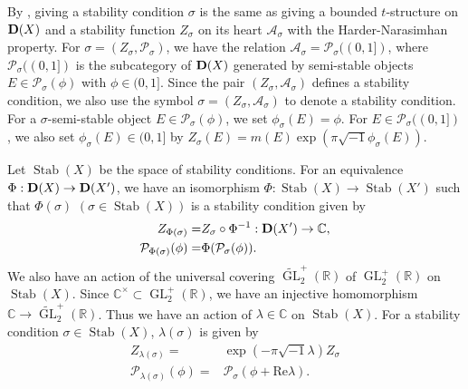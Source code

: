 \documentclass[10pt]{amsart}
\def\cal{\mathcal}
\def\Bbb{\mathbb}
\newcommand{\GL}  {\operatorname{GL}}
\newcommand{\Stab}{\operatorname{Stab}}
\numberwithin{equation}{section}
\theoremstyle{plain}
\theoremstyle{definition}
\theoremstyle{remark}
\begin{document}
By \cite[Prop. 5.3]{Br:stability},
giving a stability condition $\sigma$ is
the same as giving a bounded $t$-structure on ${\bf D}(X)$ 
and a stability function $Z_\sigma$ on its heart ${\cal A}_\sigma$
with the Harder-Narasimhan property.
For $\sigma=(Z_\sigma,{\cal P}_\sigma)$,
we have the relation ${\cal A}_\sigma ={\cal P}_\sigma((0,1])$,
where ${\cal P}_\sigma((0,1])$ is the subcategory of ${\bf D}(X)$
generated by semi-stable objects $E \in {\cal P}_\sigma(\phi)$ with 
$\phi \in (0,1]$.  
Since the pair $(Z_\sigma,{\cal A}_\sigma)$
defines a stability condition, 
we also use the symbol $\sigma=(Z_\sigma,{\cal A}_\sigma)$
to denote a stability condition.
For a $\sigma$-semi-stable object $E \in 
{\cal P}_\sigma(\phi)$, we set $\phi_\sigma(E)=\phi$.
For $E \in {\cal P}_\sigma((0,1])$,
we also set $\phi_\sigma(E) \in (0,1]$ 
by $Z_\sigma(E)=m(E)\exp(\pi \sqrt{-1} \phi_\sigma(E))$. 

Let $\Stab(X)$ be the space of stability conditions.
For an equivalence $\Phi:{\bf D}(X) \to {\bf D}(X')$,
we have an isomorphism $\Phi:\Stab(X) \to \Stab(X')$
such that 
$\Phi(\sigma)$ $(\sigma \in \Stab(X))$ 
is a stability condition given by
\begin{equation}\label{eq:FM-action}
\begin{split}
Z_{\Phi(\sigma)}=& Z_\sigma \circ \Phi^{-1}:{\bf D}(X') \to {\Bbb C},\\
{\cal P}_{\Phi(\sigma)}(\phi)=& \Phi({\cal P}_\sigma(\phi)).
\end{split}
\end{equation}
%
We also have an action of the universal covering 
$\widetilde{\GL}_2^+({\Bbb R})$ of $\GL_2^+({\Bbb R})$ on 
$\Stab(X)$.
Since ${\Bbb C}^{\times} \subset  \GL_2^+({\Bbb R})$,
we have an injective homomorphism
${\Bbb C} \to  \widetilde{\GL}_2^+({\Bbb R})$.
Thus 
we have an action of $\lambda \in {\Bbb C}$ on
$\Stab(X)$. 
For a stability condition $\sigma \in \Stab(X)$, 
$\lambda(\sigma)$ is %
given by
\begin{equation}\label{eq:C-action}
\begin{split}
Z_{\lambda(\sigma)}=&
\exp(-\pi  \sqrt{-1} \lambda)Z_\sigma\\
{\cal P}_{\lambda(\sigma)}(\phi)=&
{\cal P}_\sigma(\phi+\mathrm{Re}\lambda).
\end{split}
\end{equation}
\end{document}
